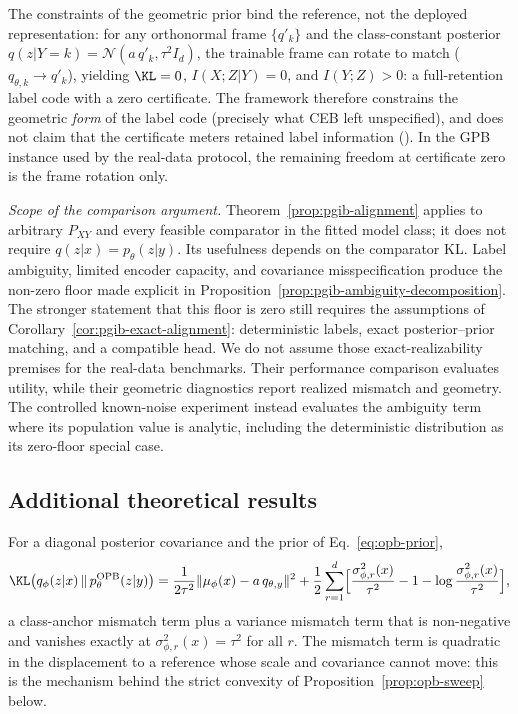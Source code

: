 \begin{remark}
\label{rem:counterexample}
The constraints of the geometric prior bind the reference, not the deployed
representation: for any orthonormal frame $\{q'_k\}$ and the class-constant posterior
$q(z|Y=k) = \mathcal{N}(a\,q'_k, \tau^2 I_d)$, the trainable frame can rotate
to match ($q_{\theta,k} \to q'_k$), yielding $\KL = 0$, $I(X;Z|Y) = 0$, and
$I(Y;Z) > 0$: a full-retention label code with a zero certificate. The framework
therefore constrains the geometric \emph{form} of the label code (precisely what CEB
left unspecified), and does not claim that the certificate meters retained label
information (\citealp{kolchinsky2019caveats}). In the GPB instance used by the real-data protocol, the remaining
freedom at certificate zero is the frame rotation only.
\end{remark}

\emph{Scope of the comparison argument.} Theorem~\ref{prop:pgib-alignment} applies to
arbitrary $P_{XY}$ and every feasible comparator in the fitted model class; it does not
require $q(z|x)=p_\theta(z|y)$. Its usefulness depends on the comparator KL. Label
ambiguity, limited encoder capacity, and covariance misspecification produce the
non-zero floor made explicit in Proposition~\ref{prop:pgib-ambiguity-decomposition}.
The stronger statement that this floor is zero still requires the assumptions of
Corollary~\ref{cor:pgib-exact-alignment}: deterministic labels, exact posterior--prior
matching, and a compatible head. We do not assume those exact-realizability premises
for the real-data benchmarks. Their performance comparison evaluates utility, while
their geometric diagnostics report realized mismatch and geometry. The controlled
known-noise experiment instead evaluates the ambiguity term where its population value
is analytic, including the deterministic distribution as its zero-floor special case.

\subsection{Additional theoretical results}

\begin{lemma}
\label{lem:opb-kl-decomposition}
For a diagonal posterior covariance and the prior of Eq.~\eqref{eq:opb-prior},
\begin{equation}
\KL\bigl(q_\phi(z|x)\,\|\,p_\theta^{\mathrm{OPB}}(z|y)\bigr)
= \frac{1}{2\tau^2}\|\mu_\phi(x) - a\,q_{\theta,y}\|^2
+ \frac12 \sum_{r=1}^{d}\Bigl[
\frac{\sigma_{\phi,r}^2(x)}{\tau^2} - 1 - \log\frac{\sigma_{\phi,r}^2(x)}{\tau^2}
\Bigr],
\label{eq:opb-kl-decomposition}
\end{equation}
a class-anchor mismatch term plus a variance mismatch term that is non-negative and
vanishes exactly at $\sigma_{\phi,r}^2(x) = \tau^2$ for all $r$. The mismatch term is
quadratic in the displacement to a reference whose scale and covariance cannot move:
this is the mechanism behind the strict convexity of
Proposition~\ref{prop:opb-sweep} below.
\end{lemma}

